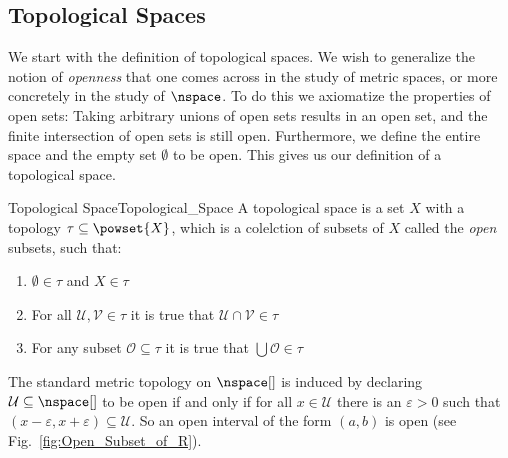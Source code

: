\documentclass[oneside]{book}                                                  %
\begin{document}
            \subsection{Topological Spaces}
                We start with the definition of topological spaces. We wish to
                generalize the notion of \textit{openness} that one comes across
                in the study of metric spaces, or more
                concretely in the study of $\nspace$. To do this we axiomatize
                the properties of open sets: Taking arbitrary unions of open
                sets results in an open set, and the finite intersection of open
                sets is still open. Furthermore, we define the entire space and
                the empty set $\emptyset$ to be open. This gives us our
                definition of a topological space.
                \begin{fdefinition}{Topological Space}{Topological_Space}
                    A topological space is a set $X$ with a topology
                    $\tau\subseteq\powset{X}$, which is a colelction of subsets
                    of $X$ called the \textit{open} subsets, such that:
                    \begin{enumerate}
                        \item \label{def:top:Empty_and_X_Open}%
                              $\emptyset\in\tau$ and $X\in\tau$
                        \item \label{def:top:Finite_Intersections}%
                              For all $\mathcal{U},\mathcal{V}\in\tau$ it is
                              true that $\mathcal{U}\cap\mathcal{V}\in\tau$
                        \item \label{def:top:Arbitrary_Unions}%
                              For any subset $\mathcal{O}\subseteq\tau$ it is
                              true that $\bigcup\mathcal{O}\in\tau$
                    \end{enumerate}
                \end{fdefinition}
                \begin{example}
                    The standard metric topology on $\nspace[]$ is induced by
                    declaring $\mathcal{U}\subseteq\nspace[]$ to be open if and
                    only if for all $x\in\mathcal{U}$ there is an
                    $\varepsilon>0$ such that
                    $(x-\varepsilon,x+\varepsilon)\subseteq\mathcal{U}$. So an
                    open interval of the form $(a,b)$ is open
                    (see Fig.~\ref{fig:Open_Subset_of_R}).
                \end{example}
\end{document}
